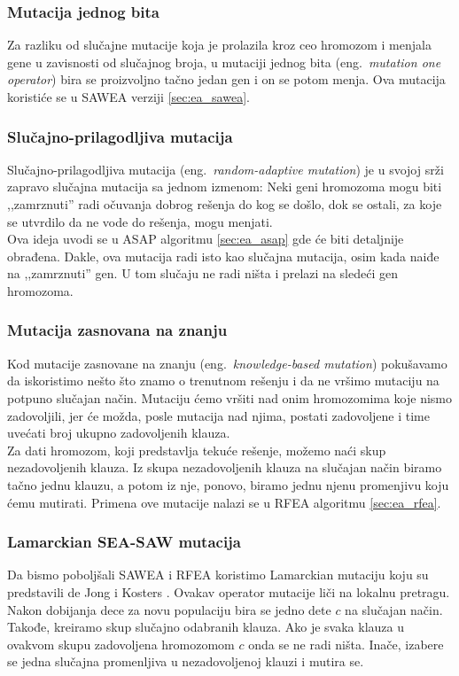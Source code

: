 \documentclass{article}
\begin{document}
\subsubsection{Mutacija jednog bita}
\label{sec:ea_mutacija_one}
Za razliku od slučajne mutacije koja je prolazila kroz ceo hromozom i menjala gene u
zavisnosti od slučajnog broja, u mutaciji jednog bita (eng.~{\em mutation one operator})
bira se proizvoljno tačno jedan gen i on se potom menja. 
Ova mutacija koristiće se u SAWEA verziji \ref{sec:ea_sawea}.

\subsubsection{Slučajno-prilagodljiva mutacija}
\label{sec:ea_slucajno_prilagodljiva_mutacija}
Slučajno-prilagodljiva mutacija (eng.~{\em random-adaptive mutation}) \cite{adaptiveEA} 
je u svojoj srži zapravo slučajna mutacija sa jednom izmenom:
Neki geni hromozoma mogu biti ,,zamrznuti'' radi očuvanja dobrog rešenja do kog se došlo,
dok se ostali, za koje se utvrdilo da ne vode do rešenja, mogu menjati.\\

Ova ideja uvodi se u ASAP algoritmu \ref{sec:ea_asap} gde će biti detaljnije obrađena.
Dakle, ova mutacija radi isto kao slučajna mutacija, osim kada naiđe na ,,zamrznuti'' gen.
U tom slučaju ne radi ništa i prelazi na sledeći gen hromozoma.

\subsubsection{Mutacija zasnovana na znanju}
\label{sec:ea_mutacija_znanje}
Kod mutacije zasnovane na znanju (eng.~{\em knowledge-based mutation}) \cite{ea_with_table}
pokušavamo da iskoristimo nešto što znamo o trenutnom rešenju
i da ne vršimo mutaciju na potpuno slučajan način.
Mutaciju ćemo vršiti nad onim hromozomima koje nismo zadovoljili, 
jer će možda, posle mutacija nad njima, postati zadovoljene i time uvećati broj ukupno
zadovoljenih klauza.\\

Za dati hromozom, koji predstavlja
tekuće rešenje, možemo naći skup nezadovoljenih klauza. 
Iz skupa nezadovoljenih klauza na slučajan način biramo tačno jednu klauzu, 
a potom iz nje, ponovo, biramo jednu njenu promenjivu koju ćemu mutirati. 
Primena ove mutacije nalazi se u RFEA algoritmu \ref{sec:ea_rfea}.

\subsubsection{Lamarckian SEA-SAW mutacija}
\label{sec:ea_lamarckian}
Da bismo poboljšali SAWEA i RFEA koristimo Lamarckian mutaciju koju su predstavili 
de Jong i Kosters \cite{ea_without_table, ea_with_table}. 
Ovakav operator mutacije liči na lokalnu pretragu. 
Nakon dobijanja dece za novu populaciju bira se jedno dete $c$ na slučajan način.
Takođe, kreiramo skup slučajno odabranih klauza. 
Ako je svaka klauza u ovakvom skupu zadovoljena hromozomom $c$ onda se ne radi ništa. 
Inače, izabere se jedna slučajna promenljiva u nezadovoljenoj klauzi i mutira se.
\end{document}
